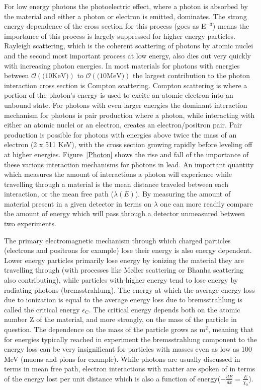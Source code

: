 For low energy photons the photoelectric effect, where a photon is absorbed by the material and either a photon or electron is emitted, dominates.  
The strong energy dependence of the cross section for this process (goes as E$^{-3}$) means the importance of this process is largely suppressed for higher energy particles.  
Rayleigh scattering, which is the coherent scattering of photons by atomic nuclei and the second most important process at low energy, also dies out very quickly with increasing photon energies.  
In most materials for photons with energies between $\mathcal{O}\left(\mathrm(10 \mathrm{KeV})\right)$ to $\mathcal{O}\left(\mathrm(10 \mathrm{MeV})\right)$ the largest contribution to the photon interaction cross section is Compton scattering.  
Compton scattering is where a portion of the photon's energy is used to excite an atomic electron into an unbound state.  
For photons with even larger energies the dominant interaction mechanism for photons is pair production where a photon, while interacting with either an atomic nuclei or an electron, creates an electron/positron pair.  
Pair production is possible for photons with energies above twice the mass of an electron (2 x 511 KeV), with the cross section growing rapidly before leveling off at higher energies.  
Figure~\ref{Photon} shows the rise and fall of the importance of these various interaction mechanisms for photons in lead.  
An important quantity which measures the amount of interactions a photon will experience while travelling through a material is the mean distance traveled between each interaction, or the mean free path ($\lambda\left(E\right)$).  
By measuring the amount of material present in a given detector in terms on $\lambda$ one can more readily compare the amount of energy which will pass through a detector unmeasured between two experiments.  


The primary electromagnetic mechanism through which charged particles (electrons and positrons for example) lose their energy is also energy dependent.  
Lower energy particles primarily lose energy by ionizing the material they are travelling through (with processes like M{\o}ller scattering or Bhanha scattering also contributing), while particles with higher energy tend to lose energy by radiating photons (bremsstrahlung).  
The energy at which the average energy loss due to ionization is equal to the average energy loss due to bremsstrahlung is called the critical energy $\epsilon_{\mathrm{C}}$.  
The critical energy depends both on the atomic number Z of the material, and more strongly, on the mass of the particle in question.  
The dependence on the mass of the particle grows as m$^2$, meaning that for energies typically reached in experiment the bremsstrahlung component to the energy loss can be very insignificant for particles with masses even as low as 100 MeV (muons and pions for example).  
While photons are usually discussed in terms in mean free path, electron interactions with matter are spoken of in terms of the energy lost per unit distance which is also a function of energy($-\frac{dE}{dx}=\frac{E}{\chi_{0}}$).  

